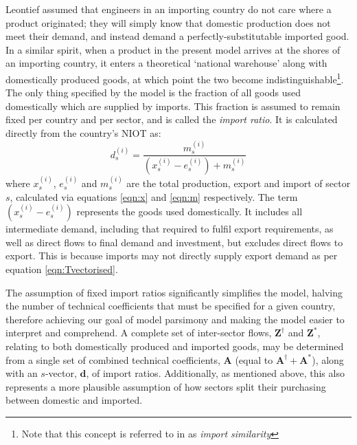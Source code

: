 \documentclass[a4paper]{article}
\begin{document}
Leontief assumed that engineers in an importing country do not care where a product originated; they will simply know that domestic production does not meet their demand, and instead demand a perfectly-substitutable imported good.
In a similar spirit, when a product in the present model arrives at the shores of an importing country, it enters a theoretical `national warehouse' along with domestically produced goods, at which point the two become indistinguishable\footnote{Note that this concept is referred to in \textcite{miller_input-output_1985} as \textit{import similarity}}.
The only thing specified by the model is the fraction of all goods used domestically which are supplied by imports. This fraction is assumed to remain fixed per country and per sector, and is called the \textit{import ratio}. It is calculated directly from the country's NIOT as:
\begin{equation}\label{eqn:importratio}
d_s^{(i)} = \frac{m_s^{(i)}}{(x_s^{(i)} - e_s^{(i)} ) + m_s^{(i)}}
\end{equation}
where $x_s^{(i)}$, $e_s^{(i)}$ and $m_s^{(i)}$ are the total production, export and import of sector $s$, calculated via equations \eqref{eqn:x} and \eqref{eqn:m} respectively.
The term $(x_s^{(i)} - e_s^{(i)} )$ represents the goods used domestically.
It includes all intermediate demand, including that required to fulfil export requirements, as well as direct flows to final demand and investment, but excludes direct flows to export.
This is because imports may not directly supply export demand as per equation \eqref{eqn:Tvectorised}.

The assumption of fixed import ratios significantly simplifies the model, halving the number of technical coefficients that must be specified for a given country, therefore achieving our goal of model parsimony and making the model easier to interpret and comprehend.
A complete set of inter-sector flows, $\boldsymbol{Z}^{\dagger}$ and $\boldsymbol{Z}^{*}$, relating to both domestically produced and imported goods, may be determined from a single set of combined technical coefficients, $\boldsymbol{A}$ (equal to $\boldsymbol{A}^{\dagger} + \boldsymbol{A}^{*}$), along with an $s$-vector, $\boldsymbol{d}$, of import ratios.
Additionally, as mentioned above, this also represents a more plausible assumption of how sectors split their purchasing between domestic and imported.
\end{document}
